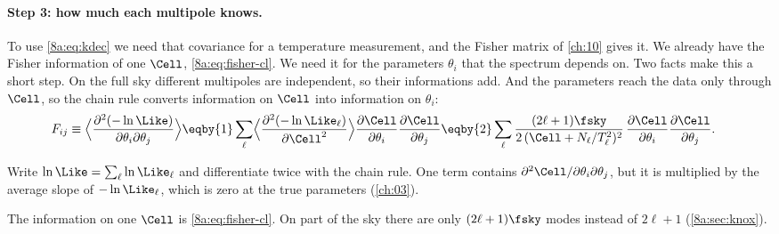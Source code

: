 \paragraph{Step 3: how much each multipole knows.}
To use \eqref{8a:eq:kdec} we need that covariance for a temperature measurement, and the Fisher
matrix of \cref{ch:10} gives it. We already have the Fisher information of one $\Cell$,
\eqref{8a:eq:fisher-cl}. We need it for the parameters $\theta_i$ that the spectrum depends on.
Two facts make this a short step. On the full sky different multipoles are independent, so their
informations add. And the parameters reach the data only through $\Cell$, so the chain rule
converts information on $\Cell$ into information on $\theta_i$:
\begin{align}
  F_{ij}\equiv\Bigl\langle\frac{\partial^2(-\ln\Like)}{\partial\theta_i\partial\theta_j}\Bigr\rangle
  &\eqby{1}\sum_\ell\Bigl\langle\frac{\partial^2(-\ln\Like_\ell)}{\partial\Cell^2}\Bigr\rangle
     \frac{\partial\Cell}{\partial\theta_i}\frac{\partial\Cell}{\partial\theta_j}
   \eqby{2}\sum_\ell\frac{(2\ell+1)\fsky}{2\,(\Cell+N_\ell/T_\ell^2)^2}\,
     \frac{\partial\Cell}{\partial\theta_i}\frac{\partial\Cell}{\partial\theta_j}.
  \label{8a:eq:fisher-params}
\end{align}
\begin{explain}
  \item Write $\ln\Like=\sum_\ell\ln\Like_\ell$ and differentiate twice with the chain rule. One
        term contains $\partial^2\Cell/\partial\theta_i\partial\theta_j$, but it is multiplied by
        the average slope of $-\ln\Like_\ell$, which is zero at the true parameters (\cref{ch:03}).
  \item The information on one $\Cell$ is \eqref{8a:eq:fisher-cl}. On part of the sky there are
        only $(2\ell+1)\fsky$ modes instead of $2\ell+1$ (\cref{8a:sec:knox}).
\end{explain}


